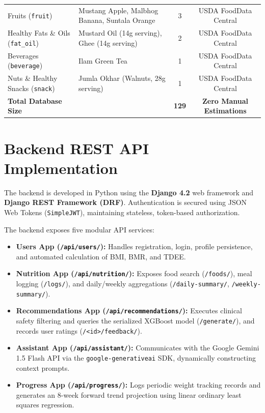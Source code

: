 \documentclass[12pt,a4paper]{report}
\begin{document}
\begin{table}[htbp]
\begin{tabular}{llcc}
Fruits (\texttt{fruit}) & Mustang Apple, Malbhog Banana, Suntala Orange & 3 & USDA FoodData Central \\
Healthy Fats \& Oils (\texttt{fat\_oil}) & Mustard Oil (14g serving), Ghee (14g serving) & 2 & USDA FoodData Central \\
Beverages (\texttt{beverage}) & Ilam Green Tea & 1 & USDA FoodData Central \\
Nuts \& Healthy Snacks (\texttt{snack}) & Jumla Okhar (Walnuts, 28g serving) & 1 & USDA FoodData Central \\
\midrule
\textbf{Total Database Size} & & \textbf{129} & \textbf{Zero Manual Estimations} \\
\bottomrule
\end{tabular}
\end{table}

\section{Backend REST API Implementation}

The backend is developed in Python using the \textbf{Django 4.2} web framework and \textbf{Django REST Framework (DRF)}. Authentication is secured using JSON Web Tokens (\texttt{SimpleJWT}), maintaining stateless, token-based authorization.

The backend exposes five modular API services:
\begin{itemize}
  \item \textbf{Users App (\texttt{/api/users/}):} Handles registration, login, profile persistence, and automated calculation of BMI, BMR, and TDEE.
  \item \textbf{Nutrition App (\texttt{/api/nutrition/}):} Exposes food search (\texttt{/foods/}), meal logging (\texttt{/logs/}), and daily/weekly aggregations (\texttt{/daily-summary/}, \texttt{/weekly-summary/}).
  \item \textbf{Recommendations App (\texttt{/api/recommendations/}):} Executes clinical safety filtering and queries the serialized XGBoost model (\texttt{/generate/}), and records user ratings (\texttt{/<id>/feedback/}).
  \item \textbf{Assistant App (\texttt{/api/assistant/}):} Communicates with the Google Gemini 1.5 Flash API via the \texttt{google-generativeai} SDK, dynamically constructing context prompts.
  \item \textbf{Progress App (\texttt{/api/progress/}):} Logs periodic weight tracking records and generates an 8-week forward trend projection using linear ordinary least squares regression.
\end{itemize}
\end{document}
